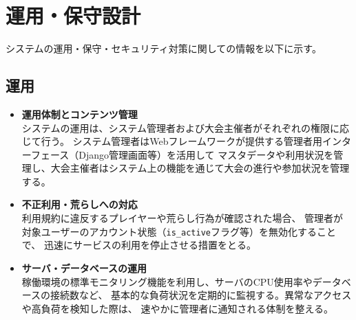 \section{運用・保守設計}

システムの運用・保守・セキュリティ対策に関しての情報を以下に示す。

\subsection{運用}
\begin{itemize}
    \item \textbf{運用体制とコンテンツ管理} \\
    システムの運用は、システム管理者および大会主催者がそれぞれの権限に応じて行う。
    システム管理者はWebフレームワークが提供する管理者用インターフェース（Django管理画面等）を活用して
    マスタデータや利用状況を管理し、大会主催者はシステム上の機能を通じて大会の進行や参加状況を管理する。
    
    \item \textbf{不正利用・荒らしへの対応} \\
    利用規約に違反するプレイヤーや荒らし行為が確認された場合、
    管理者が対象ユーザーのアカウント状態（\texttt{is\_active}フラグ等）を無効化することで、
    迅速にサービスの利用を停止させる措置をとる。
    
    \item \textbf{サーバ・データベースの運用} \\
    稼働環境の標準モニタリング機能を利用し、サーバのCPU使用率やデータベースの接続数など、
    基本的な負荷状況を定期的に監視する。異常なアクセスや高負荷を検知した際は、
    速やかに管理者に通知される体制を整える。
\end{itemize}

